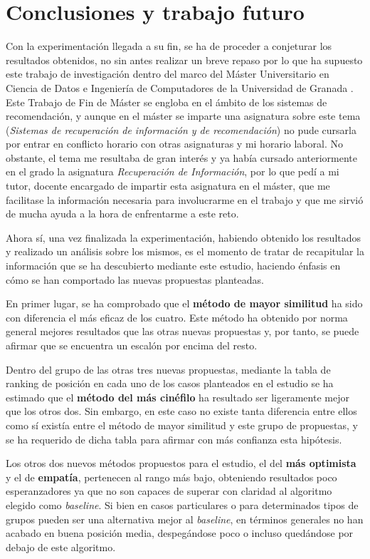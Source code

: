 \chapter{Conclusiones y trabajo futuro}

Con la experimentación llegada a su fin, se ha de proceder a conjeturar los resultados obtenidos, no sin antes realizar un breve repaso por lo que ha supuesto este trabajo de investigación dentro del marco del Máster Universitario en Ciencia de Datos e Ingeniería de Computadores de la Universidad de Granada \cite{master-datcom}. Este Trabajo de Fin de Máster se engloba en el ámbito de los sistemas de recomendación, y aunque en el máster se imparte una asignatura sobre este tema (\textit{Sistemas de recuperación de información y de recomendación}) no pude cursarla por entrar en conflicto horario con otras asignaturas y mi horario laboral. No obstante, el tema me resultaba de gran interés y ya había cursado anteriormente en el grado la asignatura \textit{Recuperación de Información}, por lo que pedí a mi tutor, docente encargado de impartir esta asignatura en el máster, que me facilitase la información necesaria para involucrarme en el trabajo y que me sirvió de mucha ayuda a la hora de enfrentarme a este reto.

Ahora sí, una vez finalizada la experimentación, habiendo obtenido los resultados y realizado un análisis sobre los mismos, es el momento de tratar de recapitular la información que se ha descubierto mediante este estudio, haciendo énfasis en cómo se han comportado las nuevas propuestas planteadas.

En primer lugar, se ha comprobado que el \textbf{método de mayor similitud} ha sido con diferencia el más eficaz de los cuatro. Este método ha obtenido por norma general mejores resultados que las otras nuevas propuestas y, por tanto, se puede afirmar que se encuentra un escalón por encima del resto.

Dentro del grupo de las otras tres nuevas propuestas, mediante la tabla de ranking de posición en cada uno de los casos planteados en el estudio se ha estimado que el \textbf{método del más cinéfilo} ha resultado ser ligeramente mejor que los otros dos. Sin embargo, en este caso no existe tanta diferencia entre ellos como sí existía entre el método de mayor similitud y este grupo de propuestas, y se ha requerido de dicha tabla para afirmar con más confianza esta hipótesis.

Los otros dos nuevos métodos propuestos para el estudio, el del \textbf{más optimista} y el de \textbf{empatía}, pertenecen al rango más bajo, obteniendo resultados poco esperanzadores ya que no son capaces de superar con claridad al algoritmo elegido como \textit{baseline}. Si bien en casos particulares o para determinados tipos de grupos pueden ser una alternativa mejor al \textit{baseline}, en términos generales no han acabado en buena posición media, despegándose poco o incluso quedándose por debajo de este algoritmo.

